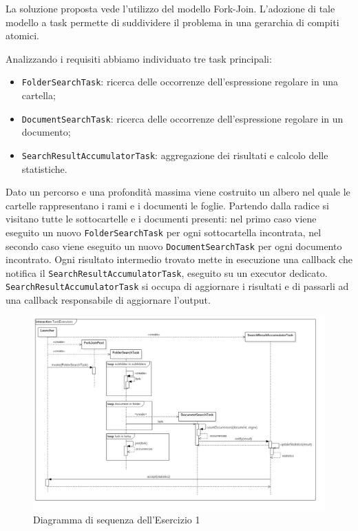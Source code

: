 \documentclass[a4paper]{article}
\begin{document}
La soluzione proposta vede l'utilizzo del modello Fork-Join.
%
L'adozione di tale modello a task permette di suddividere il problema in una gerarchia di compiti atomici.

Analizzando i requisiti abbiamo individuato tre task principali:

\begin{itemize}
%
    \item \texttt{FolderSearchTask}: ricerca delle occorrenze dell'espressione regolare in una cartella;
%
    \item \texttt{DocumentSearchTask}: ricerca delle occorrenze dell'espressione regolare in un documento;
%
    \item \texttt{SearchResultAccumulatorTask}: aggregazione dei risultati e calcolo delle statistiche.
%
\end{itemize}

Dato un percorso e una profondit\`a massima viene costruito un albero nel quale le cartelle rappresentano i rami e i documenti le foglie.
%
Partendo dalla radice si visitano tutte le sottocartelle e i documenti presenti: nel primo caso viene eseguito un nuovo \texttt{FolderSearchTask} per ogni sottocartella incontrata, nel secondo caso viene eseguito un nuovo \texttt{DocumentSearchTask} per ogni documento incontrato.
%
Ogni risultato intermedio trovato mette in esecuzione una callback che notifica il \texttt{SearchResultAccumulatorTask}, eseguito su un executor dedicato.
\texttt{SearchResultAccumulatorTask} si occupa di aggiornare i risultati e di passarli ad una callback responsabile di aggiornare l'output.
%
\begin{figure}[H]

    \centering

    \includegraphics[width=\linewidth, height=\textheight,keepaspectratio]{TaskExecutors}

    \caption{Diagramma di sequenza dell'Esercizio 1}

    \label{fig:task-executors}

\end{figure}
\newpage
\end{document}
